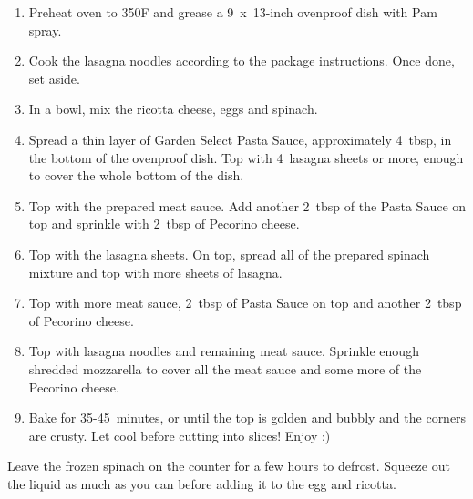 \begin{enumerate}
    \item Preheat oven to 350\degree F and grease a 9~x~13-inch ovenproof dish with Pam spray.
    \item Cook the lasagna noodles according to the package instructions. Once done, set aside.
    \item In a bowl, mix the ricotta cheese, eggs and spinach.
    \item Spread a thin layer of Garden Select Pasta Sauce, approximately 4~tbsp, in the bottom of the ovenproof dish. Top with 4~lasagna sheets or more, enough to cover the whole bottom of the dish.
    \item Top with the prepared meat sauce. Add another 2~tbsp of the Pasta Sauce on top and sprinkle with 2~tbsp of Pecorino cheese.
    \item Top with the lasagna sheets. On top, spread all of the prepared spinach mixture and top with more sheets of lasagna.
    \item Top with more meat sauce, 2~tbsp of Pasta Sauce on top and another 2~tbsp of Pecorino cheese.
    \item Top with lasagna noodles and remaining meat sauce. Sprinkle enough shredded mozzarella to cover all the meat sauce and some more of the Pecorino cheese.
    \item Bake for 35-45~minutes, or until the top is golden and bubbly and the corners are crusty. Let cool before cutting into slices! Enjoy :)
\end{enumerate}

Leave the frozen spinach on the counter for a few hours to defrost. Squeeze out the liquid as much as you can before adding it to the egg and ricotta.

